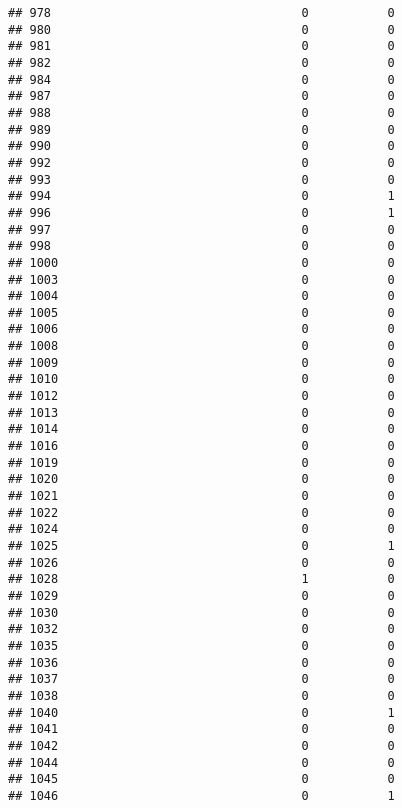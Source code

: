 \documentclass[
]{article}
\begin{document}
\begin{verbatim}
## 978                                   0           0
## 980                                   0           0
## 981                                   0           0
## 982                                   0           0
## 984                                   0           0
## 987                                   0           0
## 988                                   0           0
## 989                                   0           0
## 990                                   0           0
## 992                                   0           0
## 993                                   0           0
## 994                                   0           1
## 996                                   0           1
## 997                                   0           0
## 998                                   0           0
## 1000                                  0           0
## 1003                                  0           0
## 1004                                  0           0
## 1005                                  0           0
## 1006                                  0           0
## 1008                                  0           0
## 1009                                  0           0
## 1010                                  0           0
## 1012                                  0           0
## 1013                                  0           0
## 1014                                  0           0
## 1016                                  0           0
## 1019                                  0           0
## 1020                                  0           0
## 1021                                  0           0
## 1022                                  0           0
## 1024                                  0           0
## 1025                                  0           1
## 1026                                  0           0
## 1028                                  1           0
## 1029                                  0           0
## 1030                                  0           0
## 1032                                  0           0
## 1035                                  0           0
## 1036                                  0           0
## 1037                                  0           0
## 1038                                  0           0
## 1040                                  0           1
## 1041                                  0           0
## 1042                                  0           0
## 1044                                  0           0
## 1045                                  0           0
## 1046                                  0           1

\end{verbatim}
\end{document}
